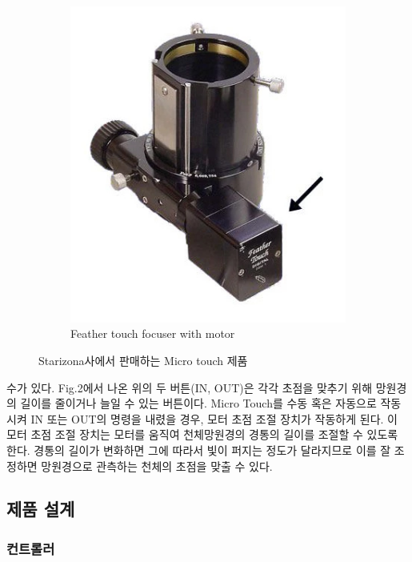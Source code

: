 \begin{figure}[h]
\begin{center}
\begin{subfigure}{0.45\textwidth}
			\label{fig:microtouch_3}
		\end{subfigure}
		\begin{subfigure}{0.45\textwidth}
			\includegraphics[width=0.9\linewidth]{microtouch_4}
			\caption{Feather touch focuser with motor}
			\label{fig:microtouch_4}
		\end{subfigure}
		\caption{Starizona사에서 판매하는 Micro touch 제품}
		\label{fig:microtouch}
	\end{center}
\end{figure}



수가 있다. Fig.2에서 나온 위의 두 버튼(IN, OUT)은 각각 초점을 맞추기 위해 망원경의 길이를 줄이거나 늘일 수 있는 버튼이다. Micro Touch를 수동 혹은 자동으로 작동시켜 IN 또는 OUT의 명령을 내렸을 경우, 모터 초점 조절 장치가 작동하게 된다. 이 모터 초점 조절 장치는 모터를 움직여 천체망원경의 경통의 길이를 조절할 수 있도록 한다. 경통의 길이가 변화하면 그에 따라서 빛이 퍼지는 정도가 달라지므로 이를 잘 조정하면 망원경으로 관측하는 천체의 초점을 맞출 수 있다.

\subsection{제품 설계}

\subsubsection{컨트롤러}


